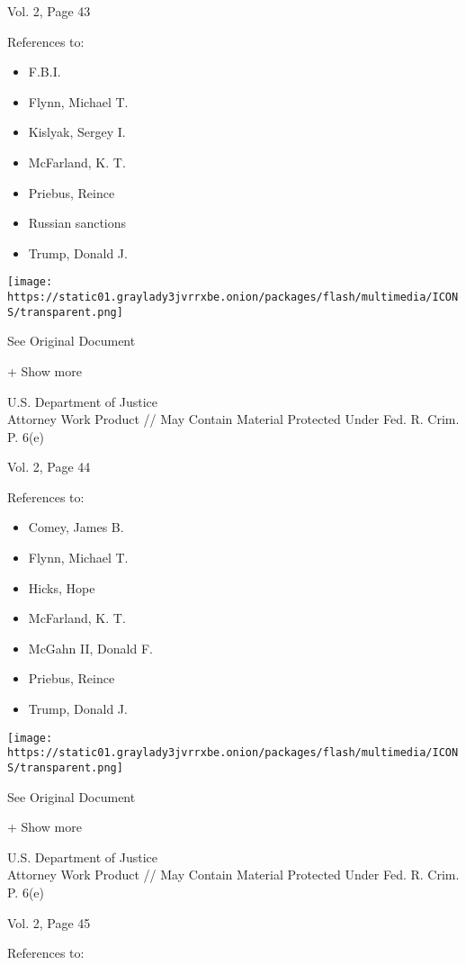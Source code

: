 Vol. 2, Page 43

References to:

\begin{itemize}
\tightlist
\item
  F.B.I.
\item
  Flynn, Michael T.
\item
  Kislyak, Sergey I.
\item
  McFarland, K. T.
\item
  Priebus, Reince
\item
  Russian sanctions
\item
  Trump, Donald J.
\end{itemize}

\protect\hyperlink{}{}

\texttt{[image: https://static01.graylady3jvrrxbe.onion/packages/flash/multimedia/ICONS/transparent.png]}

See Original Document

+ Show more

U.S. Department of Justice\\
Attorney Work Product // May Contain Material Protected Under Fed. R.
Crim. P. 6(e)

Vol. 2, Page 44

References to:

\begin{itemize}
\tightlist
\item
  Comey, James B.
\item
  Flynn, Michael T.
\item
  Hicks, Hope
\item
  McFarland, K. T.
\item
  McGahn II, Donald F.
\item
  Priebus, Reince
\item
  Trump, Donald J.
\end{itemize}

\protect\hyperlink{}{}

\texttt{[image: https://static01.graylady3jvrrxbe.onion/packages/flash/multimedia/ICONS/transparent.png]}

See Original Document

+ Show more

U.S. Department of Justice\\
Attorney Work Product // May Contain Material Protected Under Fed. R.
Crim. P. 6(e)

Vol. 2, Page 45

References to:

